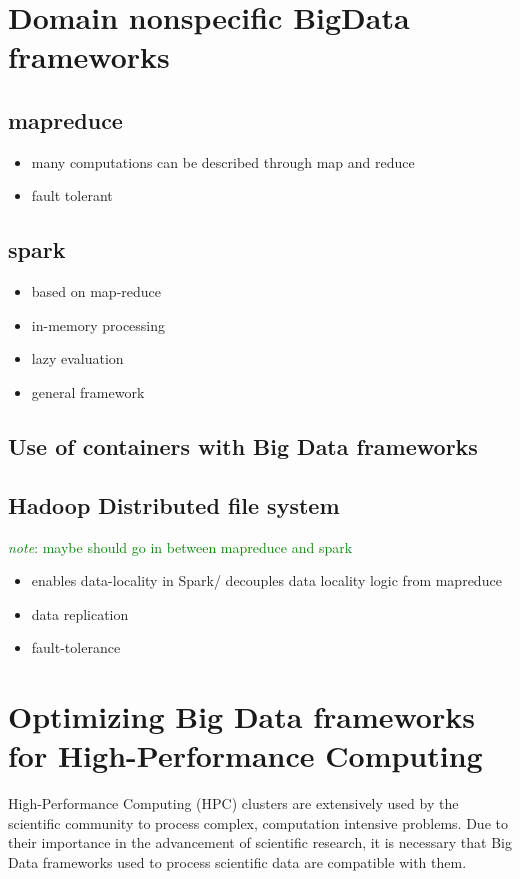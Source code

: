 \documentclass{report}
\newcommand{\note}[1]{\textcolor{green}{\textit{note}: #1}}
\begin{document}
\chapter{Domain nonspecific BigData frameworks}
	\section{mapreduce}
		\begin{itemize}
			\item many computations can be described through map and reduce
			\item fault tolerant
		\end{itemize}
	\section{spark}
		\begin{itemize}
			\item based on map-reduce
			\item in-memory processing
			\item lazy evaluation
			\item general framework
		\end{itemize}
	\section{Use of containers with Big Data frameworks}
	\section{Hadoop Distributed file system}
		\note{maybe should go in between mapreduce and spark}
		\begin{itemize}
			\item enables data-locality in Spark/ decouples data locality logic from mapreduce\
			\item data replication
			\item fault-tolerance
		\end{itemize}
\chapter{Optimizing Big Data frameworks for High-Performance Computing}
	

	High-Performance Computing (HPC) clusters are extensively used by the scientific community to process complex, computation intensive problems. Due to their importance in the advancement of scientific research, it is necessary that Big Data frameworks used to process scientific data are compatible with them. 
	
\end{document}
